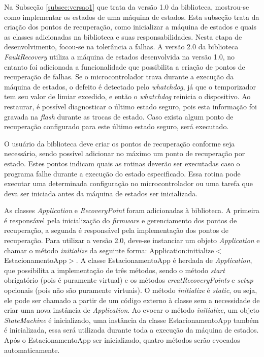 Na Subseção \ref{subsec:versao1} que trata da versão 1.0 da biblioteca, mostrou-se como implementar os estados de uma máquina de estados. Esta subseção trata da criação dos pontos de recuperação, como inicializar a máquina de estados e quais as classes adicionadas na biblioteca e suas responsabilidades. Nesta etapa de desenvolvimento, focou-se na tolerância a falhas. A versão 2.0 da biblioteca \textit{FaultRecovery} utiliza a máquina de estados desenvolvida na versão 1.0, no entanto foi adicionada a funcionalidade que possibilita a criação de pontos de recuperação de falhas. Se o microcontrolador trava durante a execução da máquina de estados, o defeito é detectado pelo \textit{whatchdog}, já que o temporizador tem seu valor de limiar excedido, e então o \textit{whatchdog} reinicia o dispositivo. Ao restaurar, é possível diagnosticar o último estado seguro, pois esta informação foi gravada na \textit{flash} durante as trocas de estado. Caso exista algum ponto de recuperação configurado para este último estado seguro, será executado. 

O usuário da biblioteca deve criar os pontos de recuperação conforme seja necessário, sendo possível adicionar no máximo um ponto de recuperação por estado. Estes pontos indicam quais as rotinas deverão ser executadas caso o programa falhe durante a execução do estado especificado. Essa rotina pode executar uma determinada configuração no microcontrolador ou uma tarefa que deva ser iniciada antes da máquina de estados ser inicializada.

As classes \textit{Application} e \textit{RecoveryPoint} foram adicionadas à biblioteca. A primeira é responsável pela inicialização do \textit{firmware} e gerenciamento dos pontos de recuperação, a segunda é responsável pela implementação dos pontos de recuperação. Para utilizar a versão 2.0, deve-se instanciar um objeto \textit{Application} e chamar o método \textit{initialize} da seguinte forma: Application:initialize$<$EstacionamentoApp$>$. A classe EstacionamentoApp é herdada de \textit{Application}, que possibilita a implementação de três métodos, sendo o método \textit{start} obrigatório (pois é puramente virtual) e os métodos \textit{creatRecoveryPoints} e \textit{setup} opcionais (pois não são puramente virtuais). O método \textit{initialize} é \textit{static}, ou seja, ele pode ser chamado a partir de um código externo à classe sem a necessidade de criar uma nova instância de \textit{Application}. Ao evocar o método \textit{initialize}, um objeto \textit{StateMachine} é inicializado, uma instância da classe EstacionamentoApp também é inicializada, essa será utilizada durante toda a execução da máquina de estados. Após o EstacionamentoApp ser inicializado, quatro métodos serão evocados automaticamente. 

